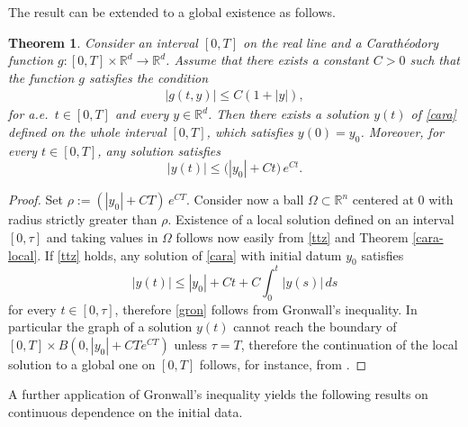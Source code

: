 \documentclass[A4paper,11pt]{article}
\newtheorem{theorem}{Theorem}[section]
\theoremstyle{definition}
\newcommand{\R}{\mathbb{R}}
\begin{document}
The result can be extended to a global existence as follows.

\begin{theorem}\label{cara-global}
Consider an interval $[0,T]$  on the real line and a  Carath{\'e}odory function $g\colon[0,T]\times \R^d \to \R^d$.
Assume that there exists a constant $C > 0$ such that the function $g$ satisfies the condition
\begin{align}\label{ttz}
|g(t,y)|\le C(1+|y|),
\end{align}
for a.e.\ $t \in [0,T]$ and every $y \in \mathbb R^d$. Then there exists a solution $y(t)$ of \eqref{cara} defined on the whole interval $[0,T]$, which satisfies $y(0)=y_0$. Moreover, for every $t \in [0,T]$, any solution satisfies
\begin{equation}\label{gron}
|y(t)|\le \Big(|y_0|+ Ct\Big) \,e^{Ct}.
\end{equation}
\end{theorem}

\begin{proof}
Set $\rho:= (|y_0|+CT) \,e^{CT}$. Consider now a ball $\Omega \subset \mathbb R^n$ centered at $0$ with radius strictly greater than $\rho$. Existence of a local solution defined on an interval $[0,\tau]$ and taking values in $\Omega$ follows now easily from \eqref{ttz} and Theorem \ref{cara-local}. If \eqref{ttz} holds, any solution of \eqref{cara} with initial datum $y_0$ satisfies
$$
|y(t)|\le |y_0|+ Ct+C\int_0^t |y(s)|\,ds
$$
for every $t \in [0,\tau]$, therefore \eqref{gron} follows from Gronwall's inequality. In particular the graph of a solution $y(t)$ cannot reach the boundary of $[0,T]\times B(0,|y_0|+CTe^{CT})$ unless $\tau=T$, therefore the continuation of the local solution to a global one on $[0,T]$ follows, for instance, from \cite[Chapter 1, Theorem 4]{Fil}.
\end{proof}

A further application of Gronwall's inequality yields the following results on continuous dependence on the initial data.
\end{document}
